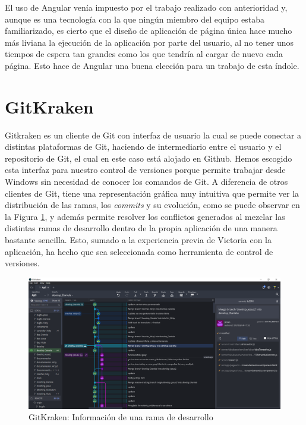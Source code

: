 \documentclass[11pt]{book}
\begin{document}
El uso de Angular venía impuesto por el trabajo realizado con anterioridad y, aunque es una tecnología con la que ningún miembro del equipo estaba familiarizado, es cierto que el diseño de aplicación de página única hace mucho más liviana la ejecución de la aplicación por parte del usuario, al no tener unos tiempos de espera tan grandes como los que tendría al cargar de nuevo cada página. Esto hace de Angular una buena elección para un trabajo de esta índole.

\section{GitKraken}
Gitkraken es un cliente de Git con interfaz de usuario la cual se puede conectar a distintas plataformas de Git, haciendo de intermediario entre el usuario y el repositorio de Git, el cual en este caso está alojado en Github. Hemos escogido esta interfaz para nuestro control de versiones porque permite trabajar desde Windows sin necesidad de conocer los comandos de Git. A diferencia de otros clientes de Git, tiene una representación gráfica muy intuitiva que permite ver la distribución de las ramas, los \emph{commits} y su evolución, como se puede observar en la Figura \ref{Figura 1}, y además permite resolver los conflictos generados al mezclar las distintas ramas de desarrollo dentro de la propia aplicación de una manera bastante sencilla. Esto, sumado a la experiencia previa de Victoria con la aplicación, ha hecho que sea seleccionada como herramienta de control de versiones.
\begin{figure}
	\centering
	\includegraphics[scale=0.4]{gitkraken}
	\caption{GitKraken: Información de una rama de desarrollo}
	\label{Figura 1}
\end{figure}
\end{document}
